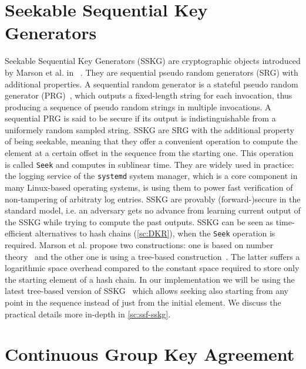 \section{Seekable Sequential Key Generators}\label{sc:SSKG}

Seekable Sequential Key Generators (SSKG) are cryptographic objects introduced by Marson et al. in ~\cite{ESORICS:MarPoe13}.
They are sequential pseudo random generators (SRG) with additional properties.
A sequential random generator is a stateful pseudo random generator (PRG)~\cite{cryptoeprint:2017/208}, 
which outputs a fixed-length string for each invocation, 
thus producing a sequence of pseudo random strings in multiple invocations.
A sequential PRG is said to be secure if its output is indistinguishable from a uniformely random sampled string.
SSKG are SRG with the additional property of being seekable,
meaning that they offer a convenient operation to compute the
element at a certain offset in the sequence from the starting one.
This operation is called \texttt{Seek} and computes in sublinear time.
They are widely used in practice:
the logging service of the \texttt{systemd} system manager,
which is a core component in many Linux-based operating systems,
is using them to power fast verification of non-tampering of arbitraty log entries.
SSKG are provably (forward-)secure in the standard model, i.e.
an adversary gets no advance from learning current output of the SSKG
while trying to compute the past outputs.
SSKG can be seen as time-efficient alternatives to hash chains (\cref{sc:DKR}),
when the \texttt{Seek} operation is required.
Marson et al. propose two constructions: one is based on number theory~\cite{ESORICS:MarPoe13}
and the other one is using a tree-based construction~\cite{ESORICS:MarPoe14}.
The latter suffers a logarithmic space overhead 
compared to the constant space required to store 
only the starting element of a hash chain.
In our implementation we will be using the latest tree-based version of SSKG~\cite{ESORICS:MarPoe14}
which allows seeking also starting from any point in the sequence
instead of just from the initial element.
We discuss the practical details more in-depth in \cref{sc:ssf-sskg}.

\section{Continuous Group Key Agreement}\label{sc:CGKA}

